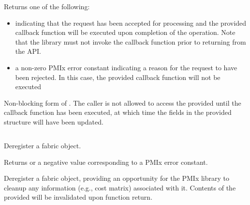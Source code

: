 \begin{arglist}
\end{arglist}

Returns one of the following:

\begin{itemize}
\item {} indicating that the request has been accepted for processing and the provided callback function will be executed upon completion of the operation. Note that the library must not invoke the callback function prior to returning from the \ac{API}.
\item a non-zero \ac{PMIx} error constant indicating a reason for the request to have been rejected. In this case, the provided callback function will not be executed
\end{itemize}

\descr

Non-blocking form of . The caller is not allowed to access the provided  until the callback function has been executed, at which time the fields in the provided  structure will have been updated.


\subsection{}

\summary

Deregister a fabric object.

\format


\begin{arglist}
\end{arglist}

Returns  or a negative value corresponding to a \ac{PMIx} error constant.

\descr

Deregister a fabric object, providing an opportunity for the \ac{PMIx} library to cleanup any information (e.g., cost matrix) associated with it. Contents of the provided  will be invalidated upon function return.


